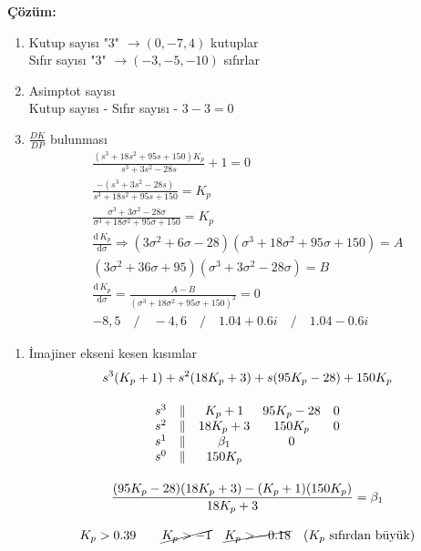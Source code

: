 \documentclass[a4paper,11pt]{article}
\begin{document}
\begin{enumerate}[label=\textbf{\alph*}{.}]
\textbf{Çözüm:}
\begin{enumerate}[resume,label=\arabic*)]
    \item Kutup sayısı "3" $\longrightarrow (0, -7, 4)$ kutuplar \\
    Sıfır sayısı "3" $\longrightarrow (-3, -5, -10)$ sıfırlar
    \item Asimptot sayısı \\
    Kutup sayısı - Sıfır sayısı - $3 - 3 = 0$
    \item $\frac{DK}{DP}$ bulunması
    \begin{gather*}
        \frac{(s^3 + 18s^2 + 95s + 150)K_p}{s^3 + 3s^2 - 28s} + 1 = 0 \\[.8em]
        \frac{-(s^3 + 3s^2 - 28s)}{s^3 + 18s^2 + 95s + 150} = K_p \\[.8em]
        \frac{\sigma^3 + 3\sigma^2 - 28\sigma}{\sigma^3 + 18\sigma^2 + 95\sigma + 150} = K_p \\[.8em]
        \frac{\mathrm{d}\,K_p}{\mathrm{d}\sigma} \Rightarrow (3\sigma^2 + 6\sigma - 28)(\sigma^3 + 18\sigma^2 + 95\sigma + 150) = A \\[.8em]
        (3\sigma^2 + 36\sigma + 95)(\sigma^3 + 3\sigma^2 - 28\sigma) = B \\[1em]
        \frac{\mathrm{d}\,K_p}{\mathrm{d}\sigma} = \frac{A - B}{(\sigma^3 + 18\sigma^2 + 95\sigma + 150)^2} = 0 \\
        -8,5 \quad / \quad -4, 6 \quad / \quad 1.04 + 0.6i \quad / \quad 1.04 - 0.6i
    \end{gather*}
\end{enumerate}
\begin{enumerate}[resume*, start=6]
    \item İmajiner ekseni kesen kısımlar
    \begin{gather*}
        s^3(K_p + 1) + s^2(18K_p + 3) + s(95K_p - 28) + 150K_p \\[1em]
        \begin{array}{lcccc}
            s^3 & \| & K_p + 1 & 95K_p - 28 & 0 \\
            s^2 & \| & 18K_p + 3 & 150K_p & 0 \\
            s^1 & \| & \beta_1 & 0 & \\
            s^0 & \| & 150K_p & &
        \end{array}\\[1em]
        \frac{(95K_p - 28)(18K_p+3) - (K_p + 1)(150K_p)}{18K_p + 3} = \beta_1 \\[.8em]
        K_p > 0.39 \qquad \cancel{K_p > -1} \quad \cancel{K_p > -0.18} \quad \text{($K_p$ sıfırdan büyük)}\\

\end{gather*}
\end{enumerate}
\end{enumerate}
\end{document}
